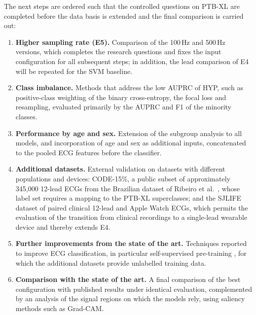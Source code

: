 \documentclass{article}
\begin{document}
The next steps are ordered such that the controlled questions on PTB-XL are completed before the data basis is extended and the final comparison is carried out:
\begin{enumerate}
  \item \textbf{Higher sampling rate (E5).} Comparison of the 100\,Hz and 500\,Hz versions, which completes the research questions and fixes the input configuration for all subsequent steps; in addition, the lead comparison of E4 will be repeated for the SVM baseline.
  \item \textbf{Class imbalance.} Methods that address the low AUPRC of HYP, such as positive-class weighting of the binary cross-entropy, the focal loss and resampling, evaluated primarily by the AUPRC and F1 of the minority classes.
  \item \textbf{Performance by age and sex.} Extension of the subgroup analysis to all models, and incorporation of age and sex as additional inputs, concatenated to the pooled ECG features before the classifier.
  \item \textbf{Additional datasets.} External validation on datasets with different populations and devices: CODE-15\%, a public subset of approximately 345,000 12-lead ECGs from the Brazilian dataset of Ribeiro et al.\ \citep{ribeiro2020}, whose label set requires a mapping to the PTB-XL superclasses; and the SJLIFE dataset of paired clinical 12-lead and Apple Watch ECGs, which permits the evaluation of the transition from clinical recordings to a single-lead wearable device and thereby extends E4.
  \item \textbf{Further improvements from the state of the art.} Techniques reported to improve ECG classification, in particular self-supervised pre-training \citep{mehari2022}, for which the additional datasets provide unlabelled training data.
  \item \textbf{Comparison with the state of the art.} A final comparison of the best configuration with published results under identical evaluation, complemented by an analysis of the signal regions on which the models rely, using saliency methods such as Grad-CAM.
\end{enumerate}
\end{document}
